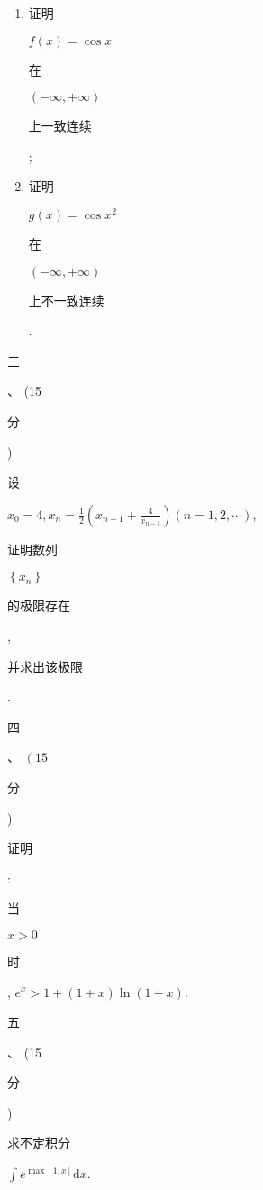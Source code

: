 \documentclass[10pt]{article}
\begin{document}
\begin{enumerate}
  \item \begin{CJK}{UTF8}{mj}证明\end{CJK} $f(x)=\cos x$ \begin{CJK}{UTF8}{mj}在\end{CJK} $(-\infty,+\infty)$ \begin{CJK}{UTF8}{mj}上一致连续\end{CJK};

  \item \begin{CJK}{UTF8}{mj}证明\end{CJK} $g(x)=\cos x^{2}$ \begin{CJK}{UTF8}{mj}在\end{CJK} $(-\infty,+\infty)$ \begin{CJK}{UTF8}{mj}上不一致连续\end{CJK}.

\end{enumerate}
\begin{CJK}{UTF8}{mj}三\end{CJK}、 (15 \begin{CJK}{UTF8}{mj}分\end{CJK}) \begin{CJK}{UTF8}{mj}设\end{CJK} $x_{0}=4, x_{n}=\frac{1}{2}\left(x_{n-1}+\frac{4}{x_{n-1}}\right)(n=1,2, \cdots)$, \begin{CJK}{UTF8}{mj}证明数列\end{CJK} $\left\{x_{n}\right\}$ \begin{CJK}{UTF8}{mj}的极限存在\end{CJK}, \begin{CJK}{UTF8}{mj}并求出该极限\end{CJK}.

\begin{CJK}{UTF8}{mj}四\end{CJK}、 $\left(15\right.$ \begin{CJK}{UTF8}{mj}分\end{CJK}) \begin{CJK}{UTF8}{mj}证明\end{CJK}: \begin{CJK}{UTF8}{mj}当\end{CJK} $x>0$ \begin{CJK}{UTF8}{mj}时\end{CJK}, $e^{x}>1+(1+x) \ln (1+x)$.

\begin{CJK}{UTF8}{mj}五\end{CJK}、 (15 \begin{CJK}{UTF8}{mj}分\end{CJK}) \begin{CJK}{UTF8}{mj}求不定积分\end{CJK} $\int e^{\max [1, x]} \mathrm{d} x$.
\end{document}
